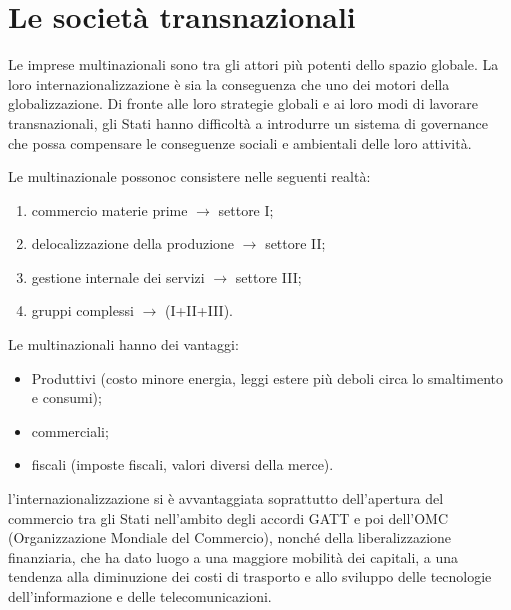 \documentclass[a4paper]{article}
\begin{document}
\pagebreak

\section{Le società transnazionali}

Le imprese multinazionali sono tra gli attori più potenti dello spazio globale. La loro
internazionalizzazione è sia la conseguenza che uno dei motori della globalizzazione. Di fronte alle loro
strategie globali e ai loro modi di lavorare transnazionali, gli Stati hanno difficoltà a introdurre un
sistema di governance che possa compensare le conseguenze sociali e ambientali delle loro attività.



Le multinazionale possonoc consistere nelle seguenti realtà:
\begin{enumerate}
    \item commercio materie prime \(\rightarrow\) settore I;
    \item delocalizzazione della produzione \(\rightarrow\) settore II;
    \item gestione internale dei servizi \(\rightarrow\) settore III;
    \item gruppi complessi \(\rightarrow\) (I+II+III).
\end{enumerate}

Le multinazionali hanno dei vantaggi:
\begin{itemize}
    \item Produttivi (costo minore energia, leggi estere più deboli circa lo smaltimento e consumi);
    \item commerciali;
    \item fiscali (imposte fiscali, valori diversi della merce).
\end{itemize}

l'internazionalizzazione si è avvantaggiata
soprattutto dell'apertura del commercio tra gli Stati nell'ambito degli accordi GATT
e poi dell'OMC (Organizzazione Mondiale del Commercio),
nonché della liberalizzazione finanziaria, che ha dato luogo a una maggiore mobilità dei capitali, a
una tendenza alla diminuzione dei costi di trasporto e allo sviluppo delle tecnologie
dell'informazione e delle telecomunicazioni.
\end{document}
